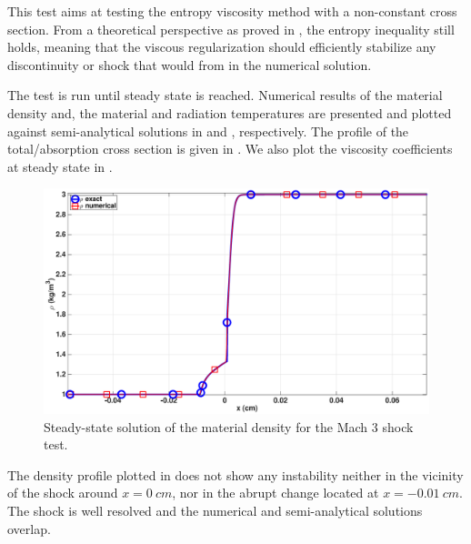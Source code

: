 \documentclass[times]{fldauth}
\begin{document}
This test aims at testing the entropy viscosity method with a non-constant cross section. From a theoretical perspective as proved in , the entropy inequality still holds, meaning that the viscous regularization should efficiently stabilize any discontinuity or shock that would from in the numerical solution. 

The test is run until steady state is reached. Numerical results of the material density and, the material and radiation temperatures are presented and plotted against semi-analytical solutions in  and , respectively. The profile of the total/absorption cross section is given in . We also plot the viscosity coefficients at steady state in .
%
\begin{figure}[H]
    \centering
    \includegraphics[width=\textwidth]{figures/dpt-xs/mach_3_nel_1000_density.eps}
    \caption{Steady-state solution of the material density for the Mach 3 shock test.}\label{fig:mach-3-dpt-xs-dens}
\end{figure}
%
The density profile plotted in  does not show any instability neither in the vicinity of the shock around $x = 0 \ cm$, nor in the abrupt change located at $x = -0.01 \ cm$. The shock is well resolved and the numerical and semi-analytical solutions overlap.
\end{document}
